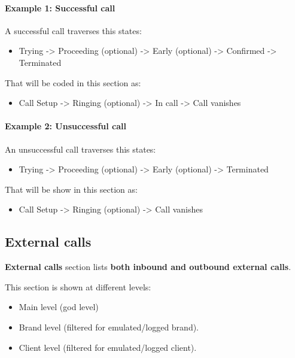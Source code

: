 \documentclass[letterpaper,10pt,english]{sphinxmanual}
\begin{document}
\paragraph{Example 1: Successful call}

A successful call traverses this states:
\begin{itemize}
\item {} 
Trying -\textgreater{} Proceeding (optional) -\textgreater{} Early (optional) -\textgreater{} Confirmed -\textgreater{} Terminated

\end{itemize}

That will be coded in this section as:
\begin{itemize}
\item {} 
Call Setup -\textgreater{} Ringing (optional) -\textgreater{} In call -\textgreater{} Call vanishes

\end{itemize}
\paragraph{Example 2: Unsuccessful call}

An unsuccessful call traverses this states:
\begin{itemize}
\item {} 
Trying -\textgreater{} Proceeding (optional) -\textgreater{} Early (optional) -\textgreater{} Terminated

\end{itemize}

That will be show in this section as:
\begin{itemize}
\item {} 
Call Setup -\textgreater{} Ringing (optional) -\textgreater{} Call vanishes

\end{itemize}


\subsection{External calls}
\label{administration_portal/brand/calls/external_calls::doc}\label{administration_portal/brand/calls/external_calls:external-calls}
\textbf{External calls} section lists \textbf{both inbound and outbound external calls}.

This section is shown at different levels:
\begin{itemize}
\item {} 
Main level (god level)

\item {} 
Brand level (filtered for emulated/logged brand).

\item {} 
Client level (filtered for emulated/logged client).

\end{itemize}
\end{document}

